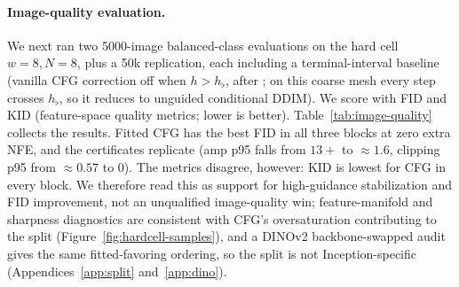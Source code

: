 \documentclass{article} %
\theoremstyle{plain}
\theoremstyle{definition}
\theoremstyle{remark}
\begin{document}
\paragraph{Image-quality evaluation.}
We next ran two 5000-image balanced-class evaluations on the hard cell $w=8,N=8$,
plus a 50k replication, each including a terminal-interval baseline (vanilla CFG
correction off when $h>h_\flat$, after \citet{kynkaanniemi2024interval}; on this
coarse mesh every step crosses $h_\flat$, so it reduces to unguided conditional
DDIM).  We score with FID and KID (feature-space quality metrics; lower is
better).
Table~\ref{tab:image-quality} collects the results.  Fitted CFG has the best
FID in all three blocks at zero extra NFE, and the certificates replicate
(amp p95 falls from $13{+}$ to ${\approx}1.6$, clipping p95 from ${\approx}0.57$
to $0$).  The metrics disagree, however: KID is lowest for CFG in every block.
We therefore read this as support for high-guidance stabilization and
FID improvement, not an unqualified image-quality win; feature-manifold and
sharpness diagnostics are consistent with CFG's oversaturation contributing to
the split (Figure~\ref{fig:hardcell-samples}), and a DINOv2
backbone-swapped audit gives the same fitted-favoring ordering, so the split is
not Inception-specific (Appendices~\ref{app:split} and~\ref{app:dino}).
\end{document}
